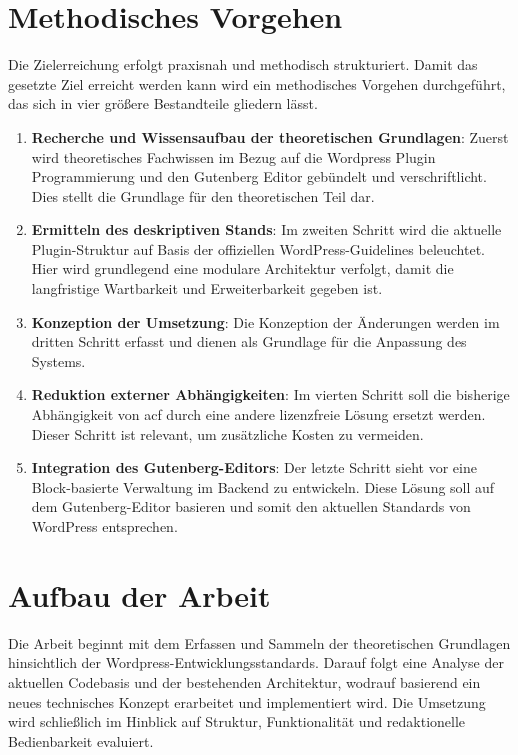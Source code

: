 \section{Methodisches Vorgehen}

Die Zielerreichung erfolgt praxisnah und methodisch strukturiert.
Damit das gesetzte Ziel erreicht werden kann wird ein methodisches Vorgehen durchgeführt, das sich in vier größere Bestandteile gliedern lässt.

\begin{enumerate}
    \item \textbf{Recherche und Wissensaufbau der theoretischen Grundlagen}: Zuerst wird theoretisches Fachwissen im Bezug auf die Wordpress Plugin Programmierung und den Gutenberg Editor gebündelt und verschriftlicht.
    Dies stellt die Grundlage für den theoretischen Teil dar.

    \item \textbf{Ermitteln des deskriptiven Stands}: Im zweiten Schritt wird die aktuelle Plugin-Struktur auf Basis der offiziellen WordPress-Guidelines beleuchtet.
    Hier wird grundlegend eine modulare Architektur verfolgt, damit die langfristige Wartbarkeit und Erweiterbarkeit gegeben ist.

    \item \textbf{Konzeption der Umsetzung}: Die Konzeption der Änderungen werden im dritten Schritt erfasst und dienen als Grundlage für die Anpassung des Systems.

    \item \textbf{Reduktion externer Abhängigkeiten}: Im vierten Schritt soll die bisherige Abhängigkeit von \gls{acf} durch eine andere lizenzfreie Lösung ersetzt werden.
    Dieser Schritt ist relevant, um zusätzliche Kosten zu vermeiden.

    \item \textbf{Integration des Gutenberg-Editors}: Der letzte Schritt sieht vor eine Block-basierte Verwaltung im Backend zu entwickeln.
    Diese Lösung soll auf dem Gutenberg-Editor basieren und somit den aktuellen Standards von WordPress entsprechen.
\end{enumerate}

\section{Aufbau der Arbeit} %

Die Arbeit beginnt mit dem Erfassen und Sammeln der theoretischen Grundlagen hinsichtlich der Wordpress-Entwicklungsstandards.
Darauf folgt eine Analyse der aktuellen Codebasis und der bestehenden Architektur, wodrauf basierend ein neues technisches Konzept erarbeitet und implementiert wird.
Die Umsetzung wird schließlich im Hinblick auf Struktur, Funktionalität und redaktionelle Bedienbarkeit evaluiert.


